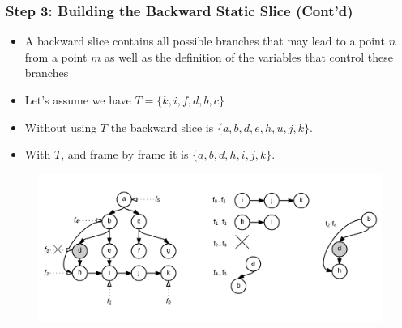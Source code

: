 \documentclass{beamer}
\begin{document}
\begin{frame}

  \frametitle{Step 3: Building the Backward Static Slice (Cont'd)}

\begin{itemize}
  \item A backward slice contains all possible branches that may lead to a point $n$ from a point $m$ as well as the definition of the variables that control these branches
  \item Let's assume we have $T = \{k, i, f, d, b, c\}$
  \item Without using $T$ the backward slice is $\{a, b, d, e, h, u, j, k\}$.
  \item With $T$, and frame by frame it is $\{a, b, d, h, i, j, k\}$.
\end{itemize}

  \begin{figure}
  \includegraphics[width=\linewidth]{media/jcharming-slicing.png}
  \end{figure}

\end{frame}
\end{document}
